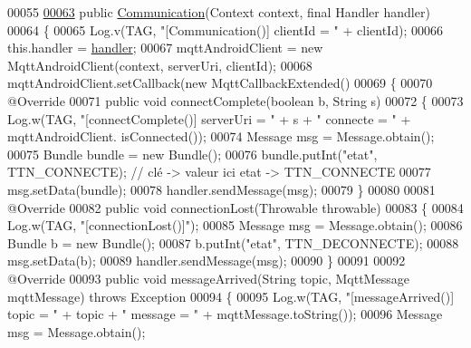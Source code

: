 \begin{DoxyCode}
00055 
\hyperlink{classcom_1_1example_1_1bee__honeyt_1_1_communication_a1f92cddc3a6b011683d0ed8d1371227d}{00063}     \textcolor{keyword}{public} \hyperlink{classcom_1_1example_1_1bee__honeyt_1_1_communication_a1f92cddc3a6b011683d0ed8d1371227d}{Communication}(Context context, \textcolor{keyword}{final} Handler handler)
00064     \{
00065         Log.v(TAG, \textcolor{stringliteral}{"[Communication()] clientId = "} + clientId);
00066         this.handler = \hyperlink{classcom_1_1example_1_1bee__honeyt_1_1_communication_add1a0705dba503c1c4c7a3168a571b20}{handler};
00067         mqttAndroidClient = \textcolor{keyword}{new} MqttAndroidClient(context, serverUri, clientId);
00068         mqttAndroidClient.setCallback(\textcolor{keyword}{new} MqttCallbackExtended()
00069         \{
00070             @Override
00071             \textcolor{keyword}{public} \textcolor{keywordtype}{void} connectComplete(\textcolor{keywordtype}{boolean} b, String s)
00072             \{
00073                 Log.w(TAG, \textcolor{stringliteral}{"[connectComplete()] serverUri = "} + s + \textcolor{stringliteral}{" connecte = "} + mqttAndroidClient.
      isConnected());
00074                 Message msg = Message.obtain();
00075                 Bundle bundle = \textcolor{keyword}{new} Bundle();
00076                 bundle.putInt(\textcolor{stringliteral}{"etat"}, TTN\_CONNECTE); \textcolor{comment}{// clé -> valeur ici etat -> TTN\_CONNECTE}
00077                 msg.setData(bundle);
00078                 handler.sendMessage(msg);
00079             \}
00080 
00081             @Override
00082             \textcolor{keyword}{public} \textcolor{keywordtype}{void} connectionLost(Throwable throwable)
00083             \{
00084                 Log.w(TAG, \textcolor{stringliteral}{"[connectionLost()]"});
00085                 Message msg = Message.obtain();
00086                 Bundle b = \textcolor{keyword}{new} Bundle();
00087                 b.putInt(\textcolor{stringliteral}{"etat"}, TTN\_DECONNECTE);
00088                 msg.setData(b);
00089                 handler.sendMessage(msg);
00090             \}
00091 
00092             @Override
00093             \textcolor{keyword}{public} \textcolor{keywordtype}{void} messageArrived(String topic, MqttMessage mqttMessage) \textcolor{keywordflow}{throws} Exception
00094             \{
00095                 Log.w(TAG, \textcolor{stringliteral}{"[messageArrived()] topic = "} + topic + \textcolor{stringliteral}{" message = "} + mqttMessage.toString());
00096                 Message msg = Message.obtain();

\end{DoxyCode}
